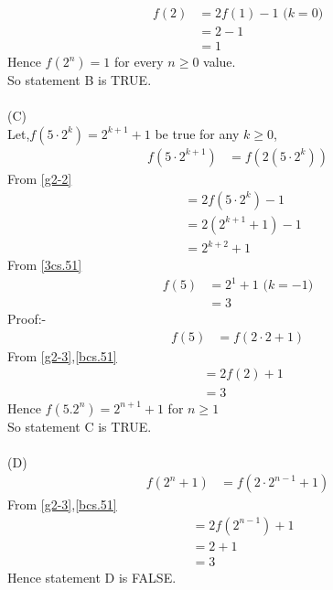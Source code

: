 \documentclass[journal,12pt,twocolumn]{IEEEtran}
\theoremstyle{remark}
\begin{document}
\begin{align}
	f(2)&=2f(1)-1\text{  ($k=0$)}\\
	&=2-1\\
	&=1\label{bcs.51}
\end{align}
Hence $f(2^n)=1$ for every $n\geq0$ value.\\
So statement B is TRUE.\\
\\(C)\\
Let,$f(5\cdot2^k)=2^{k+1}+1$ be true for any $k\geq0$,
\begin{align}
	f(5\cdot2^{k+1})&=f(2(5\cdot2^k))
\end{align}
From \eqref{g2-2}
\begin{align}
	&=2f(5\cdot2^k)-1\\
        &=2(2^{k+1}+1)-1\\
	&=2^{k+2}+1\label{3cs.51}
\end{align}
From \eqref{3cs.51}
\begin{align}
	f(5)&=2^1+1\text{  ($k=-1$)}\\
	&=3
\end{align}
Proof:-
\begin{align}
        f(5)&=f(2\cdot2+1)
\end{align}
From \eqref{g2-3},\eqref{bcs.51}
\begin{align}
        &=2f(2)+1\\
        &=3
\end{align}
Hence $f(5.2^n)=2^{n+1}+1$ for $n\geq1$\\
So statement C is TRUE.\\
\\(D)
\begin{align}
	f(2^n+1)&=f(2\cdot2^{n-1}+1)
\end{align}
From \eqref{g2-3},\eqref{bcs.51}
\begin{align}
	&=2f(2^{n-1})+1\\
	&=2+1\\
	&=3
\end{align}
Hence statement D is FALSE.
\end{document}
